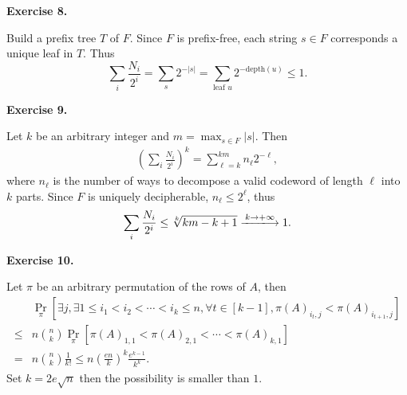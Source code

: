 \documentclass[a4paper]{article}
\newenvironment{exercise}[1]{
	\par
	\noindent\textbf{Exercise #1.}\quad
}{
	\par
	\bigskip
}
\newcommand{\pbra}[1]{\left( #1 \right)}
\newcommand{\sbra}[1]{\left[ #1 \right]}
\begin{document}
\begin{exercise}{8}
    Build a prefix tree $T$ of $F$. Since $F$ is prefix-free, each string $s\in F$ corresponds a unique leaf in $T$.
    Thus 
    $$
    \sum_i\frac{N_i}{2^i}=\sum_s 2^{-|s|}=\sum_{\text{leaf }u} 2^{-\text{depth}(u)}\leq1.
    $$
\end{exercise}

\begin{exercise}{9}
    Let $k$ be an arbitrary integer and $m=\max_{s\in F}|s|$. Then
    \begin{align*}
        \pbra{\sum_i\frac{N_i}{2^i}}^k=\sum_{\ell=k}^{km} n_\ell2^{-\ell},
    \end{align*}
    where $n_\ell$ is the number of ways to decompose a valid codeword of length $\ell$ into $k$ parts.
    Since $F$ is uniquely decipherable, $n_\ell\leq 2^\ell$, thus
    \begin{align*}
        \sum_i\frac{N_i}{2^i}\leq\sqrt[k]{km-k+1}\xlongrightarrow{k\to+\infty} 1.
    \end{align*}
\end{exercise}

\begin{exercise}{10}
    Let $\pi$ be an arbitrary permutation of the rows of $A$, then
    \begin{align*}
        &\Pr_\pi\sbra{\exists j,\exists 1\leq i_1<i_2<\cdots<i_k\leq n,\forall t\in[k-1],\pi(A)_{i_t,j}<\pi(A)_{i_{t+1},j}}\\
        \leq&n\binom nk \Pr_\pi\sbra{\pi(A)_{1,1}<\pi(A)_{2,1}<\cdots<\pi(A)_{k,1}}\\
        =&n\binom nk \frac1{k!}\leq n\pbra{\frac{en}{k}}^k\frac{e^{k-1}}{k^k}.
    \end{align*}
    Set $k=2e\sqrt n$ then the possibility is smaller than $1$.
\end{exercise}


\end{document}
